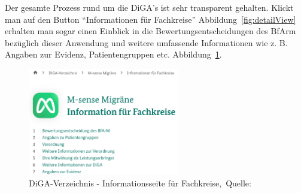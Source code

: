 Der gesamte Prozess rund um die DiGA's ist sehr transparent gehalten. Klickt man auf den Button ``Informationen für Fachkreise'' Abbildung~\ref{fig:detailView} erhalten man sogar einen Einblick in die Bewertungsentscheidungen des BfArm bezüglich dieser Anwendung und weitere umfassende Informationen wie z. B. Angaben zur Evidenz, Patientengruppen etc. Abbildung~\ref{fig:moreInfo}.
\begin{figure}[H]
	\centering
	\includegraphics[width=250px, keepaspectratio]{assets/digaBSP4.png}
	\caption[DiGA-Verzeichnis - Informationsseite für Fachkreise]{DiGA-Verzeichnis - Informationsseite für Fachkreise,~Quelle:~\cite{digafachkreise}}
	\label{fig:moreInfo}
\end{figure}
